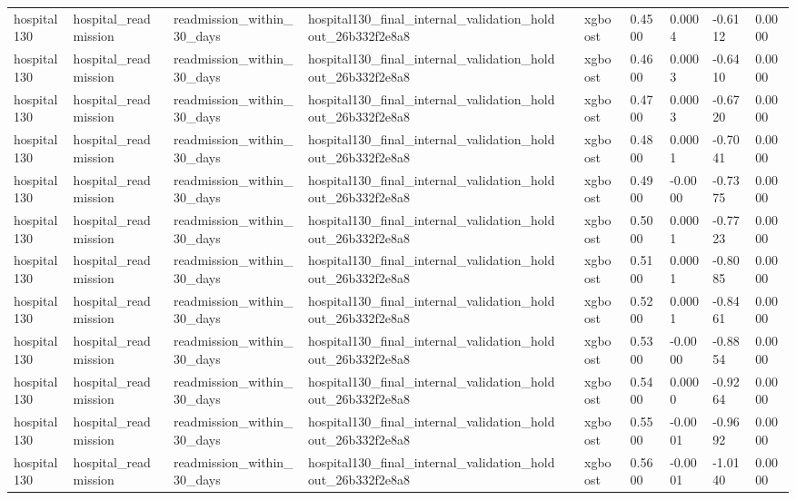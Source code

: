 \begin{tabular}{llllllllll}
hospital130 & hospital\_readmission & readmission\_within\_30\_days & hospital130\_final\_internal\_validation\_holdout\_26b332f2e8a8 &  & xgboost & 0.4500 & 0.0004 & -0.6112 & 0.0000 \\
hospital130 & hospital\_readmission & readmission\_within\_30\_days & hospital130\_final\_internal\_validation\_holdout\_26b332f2e8a8 &  & xgboost & 0.4600 & 0.0003 & -0.6410 & 0.0000 \\
hospital130 & hospital\_readmission & readmission\_within\_30\_days & hospital130\_final\_internal\_validation\_holdout\_26b332f2e8a8 &  & xgboost & 0.4700 & 0.0003 & -0.6720 & 0.0000 \\
hospital130 & hospital\_readmission & readmission\_within\_30\_days & hospital130\_final\_internal\_validation\_holdout\_26b332f2e8a8 &  & xgboost & 0.4800 & 0.0001 & -0.7041 & 0.0000 \\
hospital130 & hospital\_readmission & readmission\_within\_30\_days & hospital130\_final\_internal\_validation\_holdout\_26b332f2e8a8 &  & xgboost & 0.4900 & -0.0000 & -0.7375 & 0.0000 \\
hospital130 & hospital\_readmission & readmission\_within\_30\_days & hospital130\_final\_internal\_validation\_holdout\_26b332f2e8a8 &  & xgboost & 0.5000 & 0.0001 & -0.7723 & 0.0000 \\
hospital130 & hospital\_readmission & readmission\_within\_30\_days & hospital130\_final\_internal\_validation\_holdout\_26b332f2e8a8 &  & xgboost & 0.5100 & 0.0001 & -0.8085 & 0.0000 \\
hospital130 & hospital\_readmission & readmission\_within\_30\_days & hospital130\_final\_internal\_validation\_holdout\_26b332f2e8a8 &  & xgboost & 0.5200 & 0.0001 & -0.8461 & 0.0000 \\
hospital130 & hospital\_readmission & readmission\_within\_30\_days & hospital130\_final\_internal\_validation\_holdout\_26b332f2e8a8 &  & xgboost & 0.5300 & -0.0000 & -0.8854 & 0.0000 \\
hospital130 & hospital\_readmission & readmission\_within\_30\_days & hospital130\_final\_internal\_validation\_holdout\_26b332f2e8a8 &  & xgboost & 0.5400 & 0.0000 & -0.9264 & 0.0000 \\
hospital130 & hospital\_readmission & readmission\_within\_30\_days & hospital130\_final\_internal\_validation\_holdout\_26b332f2e8a8 &  & xgboost & 0.5500 & -0.0001 & -0.9692 & 0.0000 \\
hospital130 & hospital\_readmission & readmission\_within\_30\_days & hospital130\_final\_internal\_validation\_holdout\_26b332f2e8a8 &  & xgboost & 0.5600 & -0.0001 & -1.0140 & 0.0000 \\

\end{tabular}
